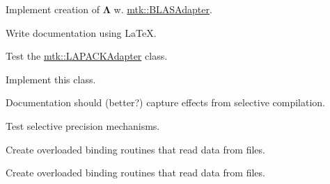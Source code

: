 \begin{DoxyRefList}
Implement creation of $ \mathbf{\Lambda}$ w. \hyperlink{classmtk_1_1BLASAdapter}{mtk\+::\+B\+L\+A\+S\+Adapter}.  
\item[\label{todo__todo000020}%
\hypertarget{todo__todo000020}{}%
File \hyperlink{mtk__lapack__adapter_8cc}{mtk\+\_\+lapack\+\_\+adapter.cc} ]Write documentation using La\+Te\+X. 
\item[\label{todo__todo000026}%
\hypertarget{todo__todo000026}{}%
File \hyperlink{mtk__lapack__adapter__test_8cc}{mtk\+\_\+lapack\+\_\+adapter\+\_\+test.cc} ]Test the \hyperlink{classmtk_1_1LAPACKAdapter}{mtk\+::\+L\+A\+P\+A\+C\+K\+Adapter} class.  
\item[\label{todo__todo000004}%
\hypertarget{todo__todo000004}{}%
File \hyperlink{mtk__quad__1d_8h}{mtk\+\_\+quad\+\_\+1d.h} ]Implement this class.  
\item[\label{todo__todo000005}%
\hypertarget{todo__todo000005}{}%
File \hyperlink{mtk__roots_8h}{mtk\+\_\+roots.h} ]Documentation should (better?) capture effects from selective compilation.

Test selective precision mechanisms.  
\item[\label{todo__todo000007}%
\hypertarget{todo__todo000007}{}%
File \hyperlink{mtk__uni__stg__grid__1d_8h}{mtk\+\_\+uni\+\_\+stg\+\_\+grid\+\_\+1d.h} ]Create overloaded binding routines that read data from files.  
\item[\label{todo__todo000010}%
\hypertarget{todo__todo000010}{}%
File \hyperlink{mtk__uni__stg__grid__2d_8h}{mtk\+\_\+uni\+\_\+stg\+\_\+grid\+\_\+2d.h} ]Create overloaded binding routines that read data from files. 
\end{DoxyRefList}